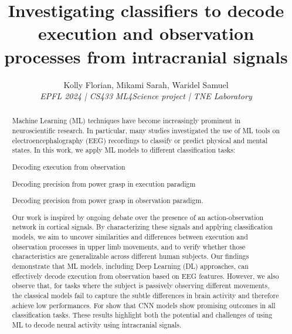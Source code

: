\documentclass[10pt,conference,compsocconf]{IEEEtran}
\begin{document}
\title{Investigating classifiers to decode execution and observation processes from intracranial signals}

\author{
  Kolly Florian, Mikami Sarah, Waridel Samuel \\
  \textit{EPFL 2024 | CS433}
  \textit{ML4Science project | TNE Laboratory}
}

\maketitle

\begin{abstract}
    Machine Learning (ML) techniques have become increasingly prominent in neuroscientific research. In particular, many studies investigated the use of ML tools on electroencephalography (EEG) recordings to classify or predict physical and mental states. In this work, we apply ML models to different classification tasks:
    \begin{inlineroman}
        \item Decoding execution from observation
        \item Decoding precision from power grasp in execution paradigm
        \item Decoding precision from power grasp in observation paradigm.
    \end{inlineroman}
    Our work is inspired by ongoing debate over the presence of an action-observation network in cortical signals. By characterizing these signals and applying classification models, we aim to uncover similarities and differences between execution and observation processes in upper limb movements, and to verify whether those characteristics are generalizable across different human subjects. Our findings demonstrate that ML models, including Deep Learning (DL) approaches, can effectively decode execution from observation based on EEG features. However, we also observe that, for tasks where the subject is passively observing different movements, the classical models fail to capture the subtle differences in brain activity and therefore achieve low performances. For show that CNN models show promising outcomes in all classification tasks. These results highlight both the potential and challenges of using ML to decode neural activity using intracranial signals.

\end{abstract}
\end{document}
